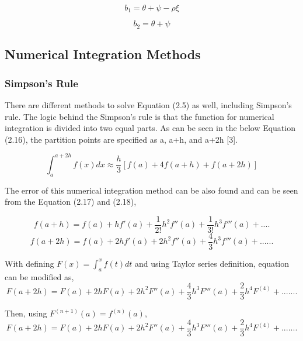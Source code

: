 \documentclass[fontsize=12pt]{article}
\numberwithin{equation}{section} %
\numberwithin{figure}{section} %
\numberwithin{table}{section} %
\begin{document}
\begin{equation}
b_1=\theta + \psi - \rho \xi
\end{equation}

\begin{equation}
b_2=\theta + \psi 
\end{equation}



\subsection{Numerical Integration Methods} \label{Numerical Integration Methods}

\subsubsection{Simpson's Rule} \label{Simpson's Rule}
 
	There are different methods to solve Equation (2.5) as well, including Simpson's rule. The logic behind the Simpson's rule is that the function for numerical integration is divided into two equal parts. As can be seen in the below Equation (2.16), the partition points are specified as a, a+h, and a+2h [3]. 

\begin{equation}
\int_{a}^{a+2h} f(x)dx \approx \dfrac{h}{3} [f(a)+4f(a+h)+f(a+2h)]
\end{equation}

The error of this numerical integration method can be also found and can be seen from the Equation (2.17) and (2.18),

\begin{equation}
f(a+h)= f(a)+ h f'(a)+\dfrac{1}{2!} h^2 f''(a)+\dfrac{1}{3!} h^3 f'''(a)+....
\end{equation}
\begin{equation}
f(a+2h)= f(a)+2hf'(a)+ 2 h^2 f''(a)+\dfrac{4}{3} h^3 f'''(a)+......
\end{equation}

With defining $F(x)=\int_{a}^{x}f(t)dt$ and using Taylor series definition, equation can be modified as,
\begin{equation}
F(a+2h)= F(a)+2 h F(a)+ 2 h^2 F''(a)+\dfrac{4}{3} h^3 F'''(a)+\dfrac{2}{3} h^4 F^{(4)}+.......
\end{equation}

Then, using $F^{(n+1)}(a)=f^{(n)}(a)$,
\begin{equation}
F(a+2h)= F(a)+2 h F(a)+ 2 h^2 F''(a)+\dfrac{4}{3} h^3 F'''(a)+\dfrac{2}{3} h^4 F^{(4)}+.......
\end{equation}
\end{document}
